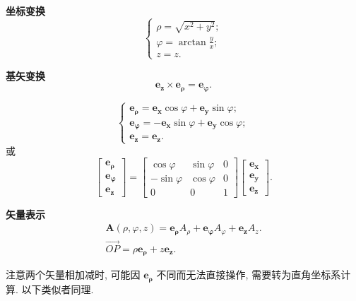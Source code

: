 \textbf{坐标变换}
\begin{equation}
    \begin{cases}
        \rho=\sqrt{x^2+y^2};        \\
        \varphi=\arctan\frac{y}{x}; \\
        z=z.
    \end{cases}
\end{equation}

\textbf{基矢变换}
\begin{equation}
    \bm{e_z}\times\bm{e_\rho}=\bm{e_\varphi}.
\end{equation}

\begin{equation}
    \begin{cases}
        \bm{e_\rho}=\bm{e_x}\cos\varphi+\bm{e_y}\sin\varphi;     \\
        \bm{e_\varphi}=-\bm{e_x}\sin\varphi+\bm{e_y}\cos\varphi; \\
        \bm{e_z}=\bm{e_z}.
    \end{cases}
\end{equation}
或
\begin{equation}
    \begin{bmatrix}
        \bm{e_\rho}    \\
        \bm{e_\varphi} \\
        \bm{e_z}
    \end{bmatrix}=\begin{bmatrix}
        \cos\varphi  & \sin\varphi & 0 \\
        -\sin\varphi & \cos\varphi & 0 \\
        0            & 0           & 1
    \end{bmatrix}\begin{bmatrix}
        \bm{e_x} \\
        \bm{e_y} \\
        \bm{e_z}
    \end{bmatrix}.
\end{equation}

\textbf{矢量表示}
\begin{gather}
    \bm{A}(\rho, \varphi, z)=\bm{e_\rho}A_\rho+\bm{e_\varphi}A_\varphi+\bm{e_z}A_z. \\
    \overrightarrow{OP}=\rho\bm{e_\rho}+z\bm{e_z}.
\end{gather}

注意两个矢量相加减时, 可能因 $\bm{e_\rho}$ 不同而无法直接操作, 需要转为直角坐标系计算. 以下类似者同理.


